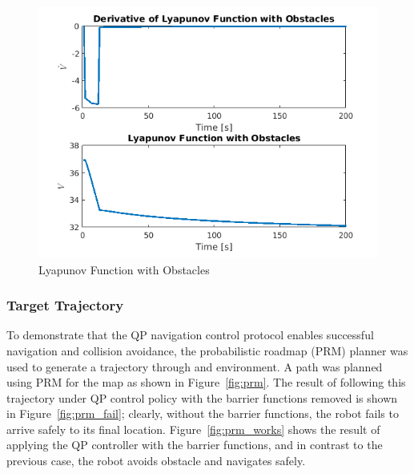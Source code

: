 \documentclass[journal]{IEEEtran}
\begin{document}
\begin{figure}[h!]
\centering
\includegraphics[scale=0.63]{v2.png} 
\caption{Lyapunov Function with Obstacles\label{fig:lyapunov}} 
\end{figure}
 
\subsubsection{Target Trajectory}
To demonstrate that the QP navigation control protocol enables successful navigation and collision avoidance, the probabilistic roadmap (PRM) planner was used to generate a trajectory through and environment. A path was planned using PRM for the map as shown in Figure~\ref{fig:prm}. The result of following  this trajectory under QP control policy with the barrier functions removed is shown in Figure~\ref{fig:prm_fail}; clearly, without the barrier functions, the robot fails to arrive safely to its final location. Figure~\ref{fig:prm_works} shows the result of applying the QP controller with the barrier functions, and in contrast to the previous case, the robot avoids obstacle and navigates safely.

%
%
\end{document}
